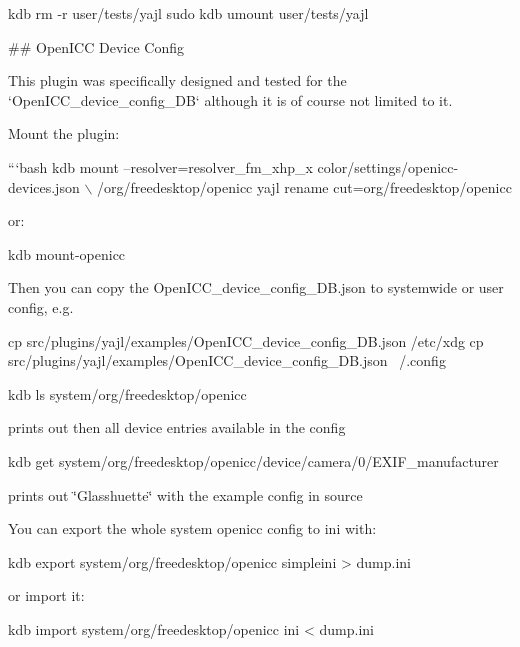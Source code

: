 kdb rm -\/r user/tests/yajl sudo kdb umount user/tests/yajl 
\begin{DoxyCode}
## OpenICC Device Config

This plugin was specifically designed and tested for the
`OpenICC\_device\_config\_DB` although it is of course not limited
to it.

Mount the plugin:

```bash
kdb mount --resolver=resolver\_fm\_xhp\_x color/settings/openicc-devices.json \(\backslash\)
  /org/freedesktop/openicc yajl rename cut=org/freedesktop/openicc
\end{DoxyCode}


or\+:


\begin{DoxyCode}
kdb mount-openicc
\end{DoxyCode}


Then you can copy the {\ttfamily Open\+I\+C\+C\+\_\+device\+\_\+config\+\_\+\+D\+B.\+json} to systemwide or user config, e.\+g.


\begin{DoxyCode}
cp src/plugins/yajl/examples/OpenICC\_device\_config\_DB.json /etc/xdg
cp src/plugins/yajl/examples/OpenICC\_device\_config\_DB.json ~/.config

kdb ls system/org/freedesktop/openicc
\end{DoxyCode}


prints out then all device entries available in the config


\begin{DoxyCode}
kdb get system/org/freedesktop/openicc/device/camera/0/EXIF\_manufacturer
\end{DoxyCode}


prints out \char`\"{}\+Glasshuette\char`\"{} with the example config in source

You can export the whole system openicc config to ini with\+:


\begin{DoxyCode}
kdb export system/org/freedesktop/openicc simpleini > dump.ini
\end{DoxyCode}


or import it\+:


\begin{DoxyCode}
kdb import system/org/freedesktop/openicc ini < dump.ini
\end{DoxyCode}
 